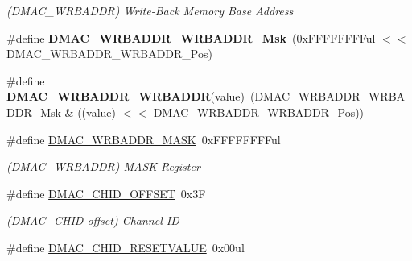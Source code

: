 \begin{DoxyCompactItemize}
\begin{DoxyCompactList}\small\item\em (D\+M\+A\+C\+\_\+\+W\+R\+B\+A\+D\+D\+R) Write-\/\+Back Memory Base Address \end{DoxyCompactList}\item 
\hypertarget{group___s_a_m_l21___d_m_a_c_gaecf23b7a2a5f594cf8246b5cdc0a24c7}{}\#define {\bfseries D\+M\+A\+C\+\_\+\+W\+R\+B\+A\+D\+D\+R\+\_\+\+W\+R\+B\+A\+D\+D\+R\+\_\+\+Msk}~(0x\+F\+F\+F\+F\+F\+F\+F\+Ful $<$$<$ D\+M\+A\+C\+\_\+\+W\+R\+B\+A\+D\+D\+R\+\_\+\+W\+R\+B\+A\+D\+D\+R\+\_\+\+Pos)\label{group___s_a_m_l21___d_m_a_c_gaecf23b7a2a5f594cf8246b5cdc0a24c7}

\item 
\hypertarget{group___s_a_m_l21___d_m_a_c_ga17e9d8e4994b0926887df47a19878b4e}{}\#define {\bfseries D\+M\+A\+C\+\_\+\+W\+R\+B\+A\+D\+D\+R\+\_\+\+W\+R\+B\+A\+D\+D\+R}(value)~(D\+M\+A\+C\+\_\+\+W\+R\+B\+A\+D\+D\+R\+\_\+\+W\+R\+B\+A\+D\+D\+R\+\_\+\+Msk \& ((value) $<$$<$ \hyperlink{group___s_a_m_l21___d_m_a_c_ga2521a42f3dbcfca0ef2f94888d5f035f}{D\+M\+A\+C\+\_\+\+W\+R\+B\+A\+D\+D\+R\+\_\+\+W\+R\+B\+A\+D\+D\+R\+\_\+\+Pos}))\label{group___s_a_m_l21___d_m_a_c_ga17e9d8e4994b0926887df47a19878b4e}

\item 
\hypertarget{group___s_a_m_l21___d_m_a_c_ga71d8874eef4222a9ac8a6e9bdfb68095}{}\#define \hyperlink{group___s_a_m_l21___d_m_a_c_ga71d8874eef4222a9ac8a6e9bdfb68095}{D\+M\+A\+C\+\_\+\+W\+R\+B\+A\+D\+D\+R\+\_\+\+M\+A\+S\+K}~0x\+F\+F\+F\+F\+F\+F\+F\+Ful\label{group___s_a_m_l21___d_m_a_c_ga71d8874eef4222a9ac8a6e9bdfb68095}

\begin{DoxyCompactList}\small\item\em (D\+M\+A\+C\+\_\+\+W\+R\+B\+A\+D\+D\+R) M\+A\+S\+K Register \end{DoxyCompactList}\item 
\hypertarget{group___s_a_m_l21___d_m_a_c_gac2d75cd66a0e511ab0cd4e14894aa1c6}{}\#define \hyperlink{group___s_a_m_l21___d_m_a_c_gac2d75cd66a0e511ab0cd4e14894aa1c6}{D\+M\+A\+C\+\_\+\+C\+H\+I\+D\+\_\+\+O\+F\+F\+S\+E\+T}~0x3\+F\label{group___s_a_m_l21___d_m_a_c_gac2d75cd66a0e511ab0cd4e14894aa1c6}

\begin{DoxyCompactList}\small\item\em (D\+M\+A\+C\+\_\+\+C\+H\+I\+D offset) Channel I\+D \end{DoxyCompactList}\item 
\hypertarget{group___s_a_m_l21___d_m_a_c_ga50d71c48a7b89b8331d0a8bda33a3f87}{}\#define \hyperlink{group___s_a_m_l21___d_m_a_c_ga50d71c48a7b89b8331d0a8bda33a3f87}{D\+M\+A\+C\+\_\+\+C\+H\+I\+D\+\_\+\+R\+E\+S\+E\+T\+V\+A\+L\+U\+E}~0x00ul\label{group___s_a_m_l21___d_m_a_c_ga50d71c48a7b89b8331d0a8bda33a3f87}


\end{DoxyCompactItemize}
